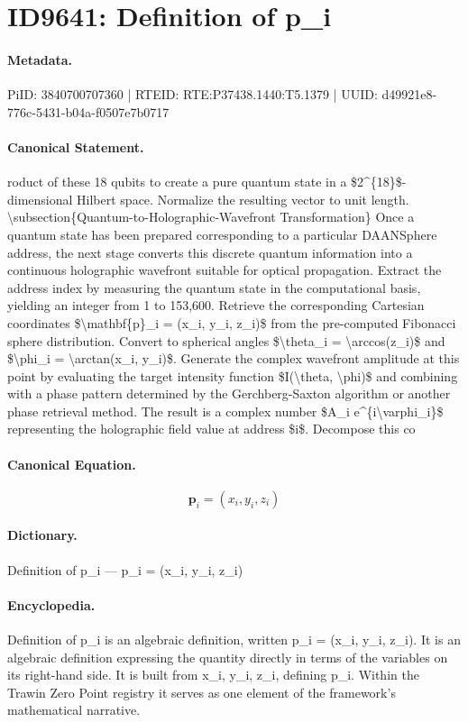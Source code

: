 \section*{ID9641: Definition of p\_i}
\paragraph{Metadata.}
PiID: 3840700707360 | RTEID: RTE:P37438.1440:T5.1379 | UUID: d49921e8-776c-5431-b04a-f0507e7b0717

\paragraph{Canonical Statement.}
roduct of these 18 qubits to create a pure quantum state in a \$2\textasciicircum{}\{18\}\$-dimensional Hilbert space. Normalize the resulting vector to unit length. \textbackslash{}subsection\{Quantum-to-Holographic-Wavefront Transformation\} Once a quantum state has been prepared corresponding to a particular DAANSphere address, the next stage converts this discrete quantum information into a continuous holographic wavefront suitable for optical propagation. Extract the address index by measuring the quantum state in the computational basis, yielding an integer from 1 to 153,600. Retrieve the corresponding Cartesian coordinates \$\textbackslash{}mathbf\{p\}\_i = (x\_i, y\_i, z\_i)\$ from the pre-computed Fibonacci sphere distribution. Convert to spherical angles \$\textbackslash{}theta\_i = \textbackslash{}arccos(z\_i)\$ and \$\textbackslash{}phi\_i = \textbackslash{}arctan(x\_i, y\_i)\$. Generate the complex wavefront amplitude at this point by evaluating the target intensity function \$I(\textbackslash{}theta, \textbackslash{}phi)\$ and combining with a phase pattern determined by the Gerchberg-Saxton algorithm or another phase retrieval method. The result is a complex number \$A\_i e\textasciicircum{}\{i\textbackslash{}varphi\_i\}\$ representing the holographic field value at address \$i\$. Decompose this co

\paragraph{Canonical Equation.}
\[
\mathbf{p}_i = (x_i, y_i, z_i)
\]

\paragraph{Dictionary.}
Definition of p\_i — p\_i = (x\_i, y\_i, z\_i)

\paragraph{Encyclopedia.}
Definition of p\_i is an algebraic definition, written p\_i = (x\_i, y\_i, z\_i). It is an algebraic definition expressing the quantity directly in terms of the variables on its right-hand side. It is built from x\_i, y\_i, z\_i, defining p\_i. Within the Trawin Zero Point registry it serves as one element of the framework's mathematical narrative.
